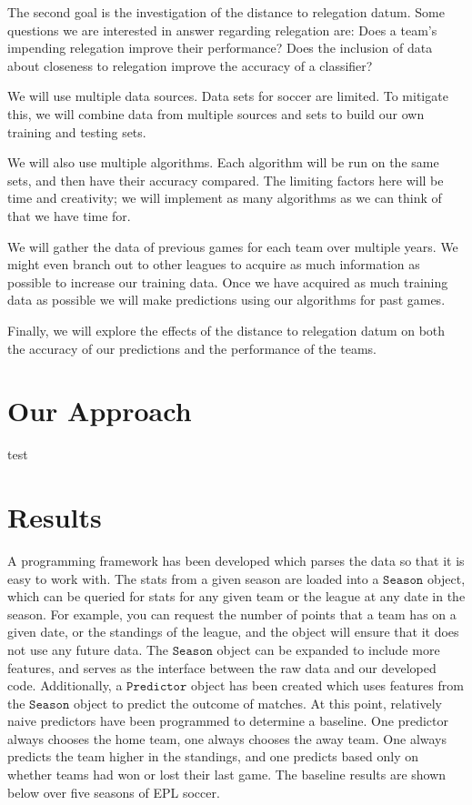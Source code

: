 \documentclass[conference]{IEEEtran}
\begin{document}
The second goal is the investigation of the distance to relegation datum. Some questions we are interested in answer regarding relegation are:
Does a team's impending relegation improve their performance?
Does the inclusion of data about closeness to relegation improve the accuracy of a classifier?

We will use multiple data sources. Data sets for soccer are limited. To mitigate this, we will combine data from multiple sources and sets to build our own training and testing sets.

We will also use multiple algorithms. Each algorithm will be run on the same sets, and then have their accuracy compared.  The limiting factors here will be time and creativity; we will implement as many algorithms as we can think of that we have time for.

We will gather the data of previous games for each team over multiple years. We might even branch out to other leagues to acquire as much information as possible to increase our training data. Once we have acquired as much training data as possible we will make predictions using our algorithms for past games.

Finally, we will explore the effects of the distance to relegation datum on both the accuracy of our predictions and the performance of the teams.
\section{Our Approach}
test

\section{Results}
A programming framework has been developed which parses the data so that it is easy to work with. The stats from a given season are loaded into a $\mathtt{Season}$ object, which can be queried for stats for any given team or the league at any date in the season. For example, you can request the number of points that a team has on a given date, or the standings of the league, and the object will ensure that it does not use any future data. The $\mathtt{Season}$ object can be expanded to include more features, and serves as the interface between the raw data and our developed code. Additionally, a $\mathtt{Predictor}$ object has been created which uses features from the $\mathtt{Season}$ object to predict the outcome of matches. At this point, relatively naive predictors have been programmed to determine a baseline. One predictor always chooses the home team, one always chooses the away team. One always predicts the team higher in the standings, and one predicts based only on whether teams had won or lost their last game. The baseline results are shown below over five seasons of EPL soccer.
\end{document}
